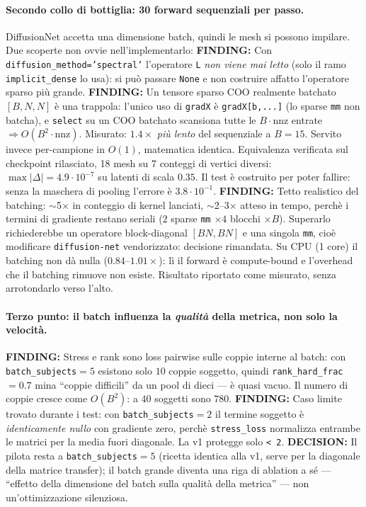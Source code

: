 \documentclass[11pt,a4paper]{article}
\newcommand{\finding}[1]{\textcolor{finding}{\textbf{FINDING:}} #1}
\newcommand{\decision}[1]{\textcolor{decision}{\textbf{DECISION:}} #1}
\begin{document}
\paragraph{Secondo collo di bottiglia: 30 forward sequenziali per passo.}
DiffusionNet accetta una dimensione batch, quindi le mesh si possono impilare.
Due scoperte non ovvie nell'implementarlo:
\finding{Con \texttt{diffusion\_method='spectral'} l'operatore \texttt{L} \emph{non viene
mai letto} (solo il ramo \texttt{implicit\_dense} lo usa): si pu\`o passare \texttt{None} e
non costruire affatto l'operatore sparso pi\`u grande.}
\finding{Un tensore sparso COO realmente batchato $[B,N,N]$ \`e una trappola: l'unico uso
di \texttt{gradX} \`e \texttt{gradX[b,...]} (lo sparse \texttt{mm} non batcha), e
\texttt{select} su un COO batchato scansiona tutte le $B\cdot\text{nnz}$ entrate
$\Rightarrow O(B^2\cdot\text{nnz})$. Misurato: $1.4\times$ \emph{pi\`u lento} del
sequenziale a $B=15$. Servito invece per-campione in $O(1)$, matematica identica.}
Equivalenza verificata sul checkpoint rilasciato, 18 mesh su 7 conteggi di vertici
diversi: $\max|\Delta| = 4.9\cdot10^{-7}$ su latenti di scala $0.35$. Il test \`e
costruito per poter fallire: senza la maschera di pooling l'errore \`e $3.8\cdot10^{-1}$.
\finding{Tetto realistico del batching: $\sim$5$\times$ in conteggio di kernel lanciati,
$\sim$2--3$\times$ atteso in tempo, perch\`e i termini di gradiente restano seriali
($2$ sparse \texttt{mm} $\times 4$ blocchi $\times B$). Superarlo richiederebbe un
operatore block-diagonal $[BN,BN]$ e una singola \texttt{mm}, cio\`e modificare
\texttt{diffusion-net} vendorizzato: decisione rimandata.}
Su CPU (1 core) il batching non d\`a nulla ($0.84$--$1.01\times$): l\`i il forward \`e
compute-bound e l'overhead che il batching rimuove non esiste. Risultato riportato come
misurato, senza arrotondarlo verso l'alto.

\paragraph{Terzo punto: il batch influenza la \emph{qualit\`a} della metrica, non solo la velocit\`a.}
\finding{Stress e rank sono loss pairwise sulle coppie interne al batch: con
\texttt{batch\_subjects}$=5$ esistono solo $10$ coppie soggetto, quindi
\texttt{rank\_hard\_frac}$=0.7$ mina ``coppie difficili'' da un pool di dieci --- \`e quasi
vacuo. Il numero di coppie cresce come $O(B^2)$: a $40$ soggetti sono $780$.}
\finding{Caso limite trovato durante i test: con \texttt{batch\_subjects}$=2$ il termine
soggetto \`e \emph{identicamente nullo} con gradiente zero, perch\`e \texttt{stress\_loss}
normalizza entrambe le matrici per la media fuori diagonale. La v1 protegge solo
\texttt{< 2}.}
\decision{Il pilota resta a \texttt{batch\_subjects}$=5$ (ricetta identica alla v1, serve
per la diagonale della matrice transfer); il batch grande diventa una riga di ablation
a s\'e --- ``effetto della dimensione del batch sulla qualit\`a della metrica'' --- non
un'ottimizzazione silenziosa.}
\end{document}

